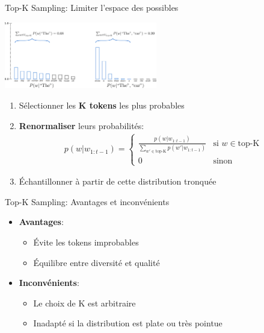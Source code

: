 \documentclass[aspectratio=169]{beamer}
\begin{document}
\begin{frame}{Top-K Sampling: Limiter l'espace des possibles}
    \begin{center}
        \includegraphics[width=0.5\textwidth]{images/top_k.png}
    \end{center}
    
    \begin{enumerate}
        \item Sélectionner les \textbf{K tokens} les plus probables
        \item \textbf{Renormaliser} leurs probabilités:
        \begin{align*}
            p(w|w_{1:t-1}) = 
            \begin{cases}
            \frac{p(w|w_{1:t-1})}{\sum_{w' \in \text{top-K}} p(w'|w_{1:t-1})} & \text{si } w \in \text{top-K} \\
            0 & \text{sinon}
            \end{cases}
        \end{align*}
        \item Échantillonner à partir de cette distribution tronquée
    \end{enumerate}
\end{frame}

\begin{frame}{Top-K Sampling: Avantages et inconvénients}
    \begin{itemize}
        \item \textbf{Avantages}:
        \begin{itemize}
            \item Évite les tokens improbables
            \item Équilibre entre diversité et qualité
        \end{itemize}
        \item \textbf{Inconvénients}:
        \begin{itemize}
            \item Le choix de K est arbitraire
            \item Inadapté si la distribution est plate ou très pointue
        \end{itemize}
    \end{itemize}
\end{frame}
\end{document}

